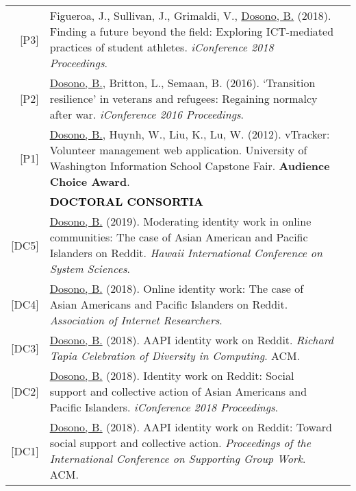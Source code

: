 \documentclass[11pt]{article}
\begin{document}
{{\begin{longtable}{Rp{0.75in}p{5.0in}}
\footnotesize{[P3]} & Figueroa, J., Sullivan, J., Grimaldi, V., \href{https://www.ideals.illinois.edu/handle/2142/100251}{Dosono, B.} (2018). Finding a future beyond the field: Exploring ICT-mediated practices of student athletes. \textit{iConference 2018 Proceedings}.\\

\footnotesize{[P2]} & \href{https://doi.org/10.9776/16575}{Dosono, B.}, Britton, L., Semaan, B. (2016). `Transition resilience' in veterans and refugees: Regaining normalcy after war. \textit{iConference 2016 Proceedings}.\\

\footnotesize{[P1]} & \href{http://youtu.be/i5US90lHIac}{Dosono, B.}, Huynh, W., Liu, K., Lu, W. (2012). vTracker: Volunteer management web application. University of Washington Information School Capstone Fair. \textbf{Audience Choice Award}.\\

& \textcolor{black}{\uppercase{\textbf{Doctoral Consortia}}}\\

\footnotesize{[DC5]} 
& \href{http://hicss.hawaii.edu/doctoral-consortium/}{Dosono, B.} (2019). Moderating identity work in online communities: The case of Asian American and Pacific Islanders on Reddit. \textit{Hawaii International Conference on System Sciences}.\\

\footnotesize{[DC4]} & \href{https://web.archive.org/web/20210309183350/https://aoir2018.sched.com/event/HPAQ/doctoral-colloquium}{Dosono, B.} (2018). Online identity work: The case of Asian Americans and Pacific Islanders on Reddit. \textit{Association of Internet Researchers}.\\

\footnotesize{[DC3]} & \href{https://tapiaconference.cmd-it.org/wp-content/uploads/2020/06/Tapia-Conference-2018-Program.pdf}{Dosono, B.} (2018). AAPI identity work on Reddit. \textit{Richard Tapia Celebration of Diversity in Computing}. ACM.\\

\footnotesize{[DC2]} & \href{https://ischools.org/the-iconference/program/doctoral-colloquium/2018-doctoral-colloquium/}{Dosono, B.} (2018). Identity work on Reddit: Social support and collective action of Asian Americans and Pacific Islanders. \textit{iConference 2018 Proceedings}.\\

\footnotesize{[DC1]} & \href{https://dl.acm.org/authorize?N42808}{Dosono, B.} (2018). AAPI identity work on Reddit: Toward social support and collective action. \textit{Proceedings of the International Conference on Supporting Group Work}. ACM.\\


\end{longtable}}}
\end{document}
